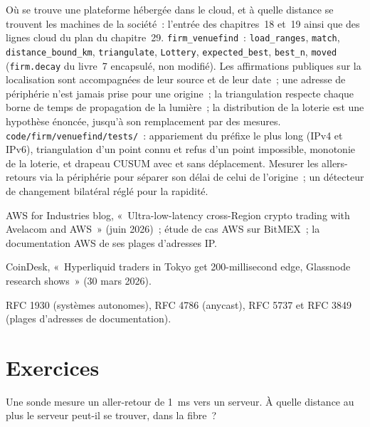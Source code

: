 \begin{build}
 Où se trouve une plateforme hébergée dans le cloud, et à quelle distance se trouvent les machines de la société~: l'entrée des chapitres~18 et~19 ainsi que des lignes cloud
du plan du chapitre~29.
 \texttt{firm\_venuefind}~: \texttt{load\_ranges}, \texttt{match}, \texttt{distance\_bound\_km}, \texttt{triangulate},
\texttt{Lottery}, \texttt{expected\_best}, \texttt{best\_n}, \texttt{moved} (\texttt{firm.decay} du livre~7 encapsulé, non modifié).
 Les affirmations publiques sur la localisation sont accompagnées de leur source et de leur date~; une adresse de périphérie n'est jamais prise pour une origine~; la triangulation respecte chaque
borne de temps de propagation de la lumière~; la distribution de la loterie est une hypothèse énoncée, jusqu'à son remplacement par des mesures.
 \texttt{code/firm/venuefind/tests/}~: appariement du préfixe le plus long (IPv4 et IPv6), triangulation d'un point connu et refus d'un
point impossible, monotonie de la loterie, et drapeau CUSUM avec et sans déplacement.
 Mesurer les allers-retours via la périphérie pour séparer son délai de celui de l'origine~; un détecteur de changement bilatéral réglé pour la rapidité.
\end{build}

\begin{omsources}
\item AWS for Industries blog, «~Ultra-low-latency cross-Region crypto trading with Avelacom and AWS~» (juin 2026)~; étude de cas AWS sur BitMEX~; la
documentation AWS de ses plages d'adresses IP.
\item CoinDesk, «~Hyperliquid traders in Tokyo get 200-millisecond edge, Glassnode research shows~» (30 mars 2026).
\item RFC 1930 (systèmes autonomes), RFC 4786 (anycast), RFC 5737 et RFC 3849 (plages d'adresses de documentation).
\end{omsources}

\section{Exercices}

\begin{exercise}[$\star$]\label{exo:nw:where-the-crypto-venues-live:1}
Une sonde mesure un aller-retour de \qty{1}{\milli\second} vers un serveur. À quelle distance au plus le serveur peut-il se trouver, dans la fibre~?
\end{exercise}


